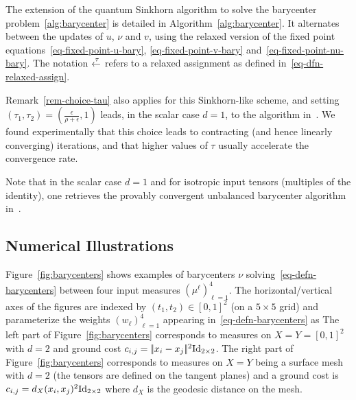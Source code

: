 The extension of the quantum Sinkhorn algorithm to solve the barycenter problem~\eqref{alg:barycenter} is detailed in Algorithm~\ref{alg:barycenter}. It alternates between the updates of $u$, $\nu$ and $v$, using the relaxed version of the fixed point equations~\eqref{eq-fixed-point-u-bary}, \eqref{eq-fixed-point-v-bary} and~\eqref{eq-fixed-point-nu-bary}. The notation $\overset{\;\tau}{\leftarrow}$ refers to a relaxed assignment as defined in~\eqref{eq-dfn-relaxed-assign}. 

\begin{rem}
Remark~\ref{rem-choice-tau} also applies for this Sinkhorn-like scheme, and setting $(\tau_1,\tau_2)=(\tfrac{\epsilon}{\rho+\epsilon},1)$ leads, in the scalar case $d=1$, to the algorithm in~\cite{2016-chizat-sinkhorn}. We found experimentally that this choice leads to contracting (and hence linearly converging) iterations, and that higher values of $\tau$ usually accelerate the convergence rate. 
\end{rem}

\begin{rem}
Note that in the scalar case $d=1$ and for isotropic input tensors (multiples of the identity), one retrieves the provably convergent unbalanced barycenter algorithm in~\cite{2016-chizat-sinkhorn}.
\end{rem}




\subsection{Numerical Illustrations}

Figure~\ref{fig:barycenters} shows examples of barycenters $\nu$ solving~\eqref{eq-defn-barycenters} between four input measures $(\mu^\ell)_{\ell=1}^4$. The horizontal/vertical axes of the figures are indexed by $(t_1,t_2) \in [0,1]^2$ (on a $5 \times 5$ grid) and parameterize the weights $(w_\ell)_{\ell=1}^4$ appearing in~\eqref{eq-defn-barycenters} as
The left part of Figure~\ref{fig:barycenters} corresponds to measures on $X=Y=[0,1]^2$ with $d=2$ and ground cost $c_{i,j}=|\!| x_i-x_j |\!|^2\mathrm{Id}_{2 \times 2}$.
%
The right part of Figure~\ref{fig:barycenters} corresponds to measures on $X=Y$ being a surface mesh with $d=2$ (the tensors are defined on the tangent planes) and a ground cost is $c_{i,j}=d_X(x_i,x_j)^2\mathrm{Id}_{2 \times 2}$ where $d_X$ is the geodesic distance on the mesh.





